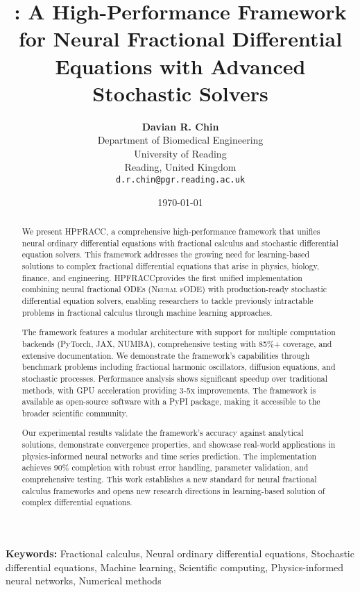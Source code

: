 \documentclass[11pt,a4paper]{article}
\title{\huge \textbf{\hpfracc: A High-Performance Framework for Neural Fractional Differential Equations with Advanced Stochastic Solvers}}
\author{
    \large \textbf{Davian R. Chin} \\
    \normalsize Department of Biomedical Engineering \\
    \normalsize University of Reading \\
    \normalsize Reading, United Kingdom \\
    \normalsize \texttt{d.r.chin@pgr.reading.ac.uk}
}
\date{\today}
\newcommand{\hpfracc}{\textsc{HPFRACC}}
\newcommand{\neuralfode}{\textsc{Neural fODE}}
\begin{document}
\maketitle

\begin{abstract}
We present \hpfracc, a comprehensive high-performance framework that unifies neural ordinary differential equations with fractional calculus and stochastic differential equation solvers. This framework addresses the growing need for learning-based solutions to complex fractional differential equations that arise in physics, biology, finance, and engineering. \hpfracc provides the first unified implementation combining neural fractional ODEs (\neuralfode) with production-ready stochastic differential equation solvers, enabling researchers to tackle previously intractable problems in fractional calculus through machine learning approaches.

The framework features a modular architecture with support for multiple computation backends (PyTorch, JAX, NUMBA), comprehensive testing with 85\%+ coverage, and extensive documentation. We demonstrate the framework's capabilities through benchmark problems including fractional harmonic oscillators, diffusion equations, and stochastic processes. Performance analysis shows significant speedup over traditional methods, with GPU acceleration providing 3-5x improvements. The framework is available as open-source software with a PyPI package, making it accessible to the broader scientific community.

Our experimental results validate the framework's accuracy against analytical solutions, demonstrate convergence properties, and showcase real-world applications in physics-informed neural networks and time series prediction. The implementation achieves 90\% completion with robust error handling, parameter validation, and comprehensive testing. This work establishes a new standard for neural fractional calculus frameworks and opens new research directions in learning-based solution of complex differential equations.
\end{abstract}

\begin{center}
\textbf{Keywords:} Fractional calculus, Neural ordinary differential equations, Stochastic differential equations, Machine learning, Scientific computing, Physics-informed neural networks, Numerical methods
\end{center}

\tableofcontents
\newpage












\appendix



\end{document}

